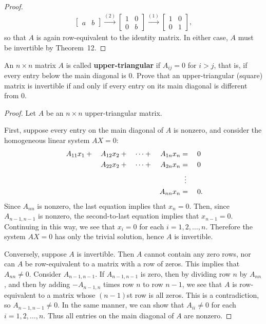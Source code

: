 \begin{proof}
\begin{gather*}
\begin{bmatrix}
      a & b
    \end{bmatrix}
    \xrightarrow{(2)}
    \begin{bmatrix}
      1 & 0 \\
      0 & b
    \end{bmatrix}
    \xrightarrow{(1)}
    \begin{bmatrix}
      1 & 0 \\
      0 & 1
    \end{bmatrix},
  \end{gather*}
  so that $A$ is again row-equivalent to the identity matrix. In
  either case, $A$ must be invertible by Theorem~12.
\end{proof}

 An $n\times n$ matrix $A$ is called {\bf upper-triangular}
if $A_{ij} = 0$ for $i > j$, that is, if every entry below the main
diagonal is $0$. Prove that an upper-triangular (square) matrix is
invertible if and only if every entry on its main diagonal is
different from $0$.
\begin{proof}
  Let $A$ be an $n\times n$ upper-triangular matrix.

  First, suppose every entry on the main diagonal of $A$ is nonzero,
  and consider the homogeneous linear system $AX = 0$:
  \begin{alignat*}{5}
    A_{11}x_1 &{}+{}& A_{12}x_2 &{}+{}& \cdots &{}+{}& A_{1n}x_n &{}={}& 0 \\
    && A_{22}x_2 &{}+{}& \cdots &{}+{}& A_{2n}x_n &{}={}& 0 \\
    && && && &\;\;\vdots \\
    && && && A_{nn}x_n &{}={}& 0\rlap.
  \end{alignat*}
  Since $A_{nn}$ is nonzero, the last equation implies that $x_n =
  0$. Then, since $A_{n-1,n-1}$ is nonzero, the second-to-last
  equation implies that $x_{n-1} = 0$. Continuing in this way, we see
  that $x_i = 0$ for each $i = 1, 2, \dots, n$. Therefore the system
  $AX = 0$ has only the trivial solution, hence $A$ is invertible.

  Conversely, suppose $A$ is invertible. Then $A$ cannot contain any
  zero rows, nor can $A$ be row-equivalent to a matrix with a row of
  zeros. This implies that $A_{nn}\neq0$. Consider $A_{n-1,n-1}$. If
  $A_{n-1,n-1}$ is zero, then by dividing row $n$ by $A_{nn}$, and
  then by adding $-A_{n-1,n}$ times row $n$ to row $n-1$, we see that
  $A$ is row-equivalent to a matrix whose $(n-1)$st row is all
  zeros. This is a contradiction, so $A_{n-1,n-1}\neq0$. In the same
  manner, we can show that $A_{ii}\neq0$ for each $i =
  1,2,\dots,n$. Thus all entries on the main diagonal of $A$ are
  nonzero.
\end{proof}

